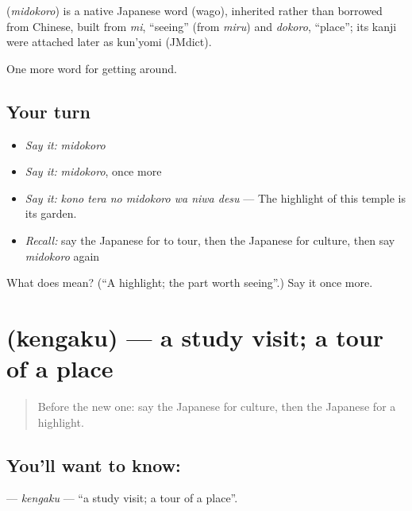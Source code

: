 \begin{cousinweb}
\textbf{} (\emph{midokoro}) is a native Japanese word (wago), inherited rather than borrowed from Chinese, built from \emph{mi}, \textquotedblleft{}seeing\textquotedblright{} (from \emph{miru}) and \emph{dokoro}, \textquotedblleft{}place\textquotedblright{}; its kanji were attached later as kun'yomi (JMdict).
\end{cousinweb}

\begin{grammarlens}[title={What you've built}]
One more word for getting around.
\end{grammarlens}

\subsection*{Your turn}
\begin{itemize}
\raggedright
  \item \emph{Say it:} \emph{midokoro}
  \item \emph{Say it:} \emph{midokoro}, once more
  \item \emph{Say it:} \emph{kono tera no midokoro wa niwa desu} — The highlight of this temple is its garden.
  \item \emph{Recall:} say the Japanese for to tour, then the Japanese for culture, then say \emph{midokoro} again
\end{itemize}

\begin{tcolorbox}[breakable,colback=teal!4,colframe=teal!35!black,title={Before you move on}]
What does  mean? (\textquotedblleft{}A highlight; the part worth seeing\textquotedblright{}.) Say it once more.
\end{tcolorbox}
\section[\texorpdfstring{\ja{けんがく} (kengaku)}{けんがく (kengaku)}]{ (kengaku) — a study visit; a tour of a place}

\label{lesson:JA-C403-kengaku}



\begin{quote}
Before the new one: say the Japanese for culture, then the Japanese for a highlight.
\end{quote}

\subsection*{You'll want to know: }
\textbf{} — \emph{kengaku} — \textquotedblleft{}a study visit; a tour of a place\textquotedblright{}.

